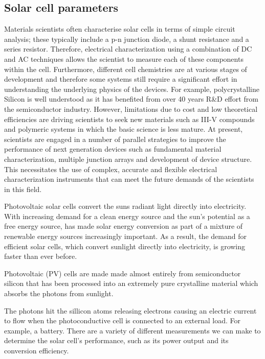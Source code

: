 \documentclass[%
 aip,
 amsmath,amssymb,
 reprint, floatfix%
]{revtex4-2}
\begin{document}
    \subsection{Solar cell parameters}
        Materials scientists often characterise solar cells in terms of simple circuit analysis; these typically include a p-n junction diode, a shunt resistance and a series resistor. Therefore, electrical characterization using a combination of DC and AC techniques allows the scientist to measure each of these components within the cell. Furthermore, different cell chemistries are at various stages of development and therefore some systems still require a significant effort in understanding the underlying physics of the devices. For example, polycrystalline Silicon is well understood as it has benefited from over 40 years R\&D effort from the semiconductor industry. However, limitations due to cost and low theoretical efficiencies are driving scientists to seek new materials such as III-V compounds and polymeric systems in which the basic science is less mature. At present, scientists are engaged in a number of parallel strategies to improve the performance of next generation devices such as fundamental material characterization, multiple junction arrays and development of device structure. This necessitates the use of complex, accurate and flexible electrical characterization instruments that can meet the future demands of the scientists in this field.
        \par
        Photovoltaic solar cells convert the suns radiant light directly into electricity. With increasing demand for a clean energy source and the sun’s potential as a free energy source, has made solar energy conversion as part of a mixture of renewable energy sources increasingly important. As a result, the demand for efficient solar cells, which convert sunlight directly into electricity, is growing faster than ever before.
        \par
        Photovoltaic (PV) cells are made made almost entirely from semiconductor silicon that has been processed into an extremely pure crystalline material which absorbs the photons from sunlight.
        \par
        The photons hit the sillicon atoms releasing electrons causing an electric current to flow when the photoconductive cell is connected to an external load. For example, a battery. There are a variety of different measurements we can make to determine the solar cell’s performance, such as its power output and its conversion efficiency.
        \par
\end{document}
